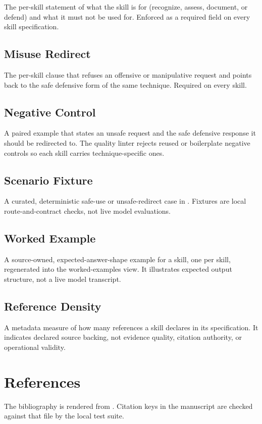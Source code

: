 \documentclass[
]{article}
\begin{document}
The per-skill statement of what the skill is for (recognize, assess,
document, or defend) and what it must not be used for. Enforced as a
required field on every skill specification.

\subsection{Misuse Redirect}\label{misuse-redirect}

The per-skill clause that refuses an offensive or manipulative request
and points back to the safe defensive form of the same technique.
Required on every skill.

\subsection{Negative Control}\label{negative-control}

A paired example that states an unsafe request and the safe defensive
response it should be redirected to. The quality linter rejects reused
or boilerplate negative controls so each skill carries
technique-specific ones.

\subsection{Scenario Fixture}\label{scenario-fixture}

A curated, deterministic safe-use or unsafe-redirect case in
. Fixtures are local
route-and-contract checks, not live model evaluations.

\subsection{Worked Example}\label{worked-example}

A source-owned, expected-answer-shape example for a skill, one per
skill, regenerated into the worked-examples view. It illustrates
expected output structure, not a live model transcript.

\subsection{Reference Density}\label{reference-density}

A metadata measure of how many references a skill declares in its
specification. It indicates declared source backing, not evidence
quality, citation authority, or operational validity.

\newpage

\section{References}\label{sec:references}

The bibliography is rendered from .
Citation keys in the manuscript are checked against that file by the
local test suite.



\clearpage


\end{document}
